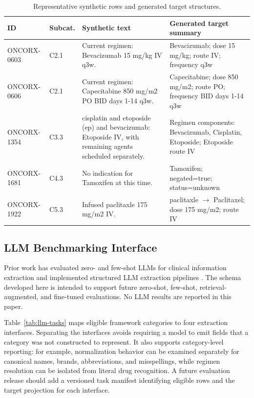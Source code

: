 \documentclass[conference]{IEEEtran}
\begin{document}
\begin{table}[t]
\caption{Representative synthetic rows and generated target structures.}
\label{tab:examples}
\centering
\footnotesize
\begin{tabularx}{\textwidth}{@{}l l Y Y@{}}
\toprule
\textbf{ID} & \textbf{Subcat.} & \textbf{Synthetic text} &
\textbf{Generated target summary} \\
\midrule
ONCORX-0603 & C2.1 & Current regimen: Bevacizumab 15 mg/kg IV q3w. & Bevacizumab; dose 15 mg/kg; route IV; frequency q3w \\
ONCORX-0606 & C2.1 & Current regimen: Capecitabine 850 mg/m2 PO BID days 1-14 q3w. & Capecitabine; dose 850 mg/m2; route PO; frequency BID days 1-14 q3w \\
ONCORX-1354 & C3.3 & cisplatin and etoposide (ep) and bevacizumab: Etoposide IV, with remaining agents scheduled separately. & Regimen components: Bevacizumab, Cisplatin, Etoposide; Etoposide route IV \\
ONCORX-1681 & C4.3 & No indication for Tamoxifen at this time. & Tamoxifen; negated=true; status=unknown \\
ONCORX-1922 & C5.3 & Infused paclitaxle 175 mg/m2 IV. & paclitaxle $\rightarrow$ Paclitaxel; dose 175 mg/m2; route IV \\
\bottomrule
\end{tabularx}
\end{table}

\subsection{LLM Benchmarking Interface}

Prior work has evaluated zero- and few-shot LLMs for clinical information
extraction and implemented structured LLM extraction pipelines
\cite{agrawal2022,hsu2025}. The schema developed here is intended to support
future zero-shot, few-shot, retrieval-augmented, and fine-tuned evaluations. No
LLM results are reported in this paper.

Table~\ref{tab:llm-tasks} maps eligible framework categories to four extraction
interfaces. Separating the interfaces avoids requiring a model to emit fields
that a category was not constructed to represent. It also supports
category-level reporting: for example, normalization behavior can be examined
separately for canonical names, brands, abbreviations, and misspellings, while
regimen resolution can be isolated from literal drug recognition. A future
evaluation release should add a versioned task manifest identifying eligible
rows and the target projection for each interface.
\end{document}
